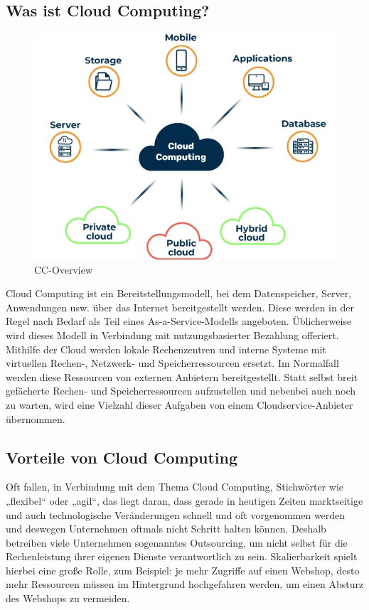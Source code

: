 \subsection{Was ist Cloud Computing?}

\begin{figure}[h]
    \centering
    \includegraphics[scale=0.9]{sections/cloud-computing/images/cc.png}
    \caption{CC-Overview}
    \label{fig:kimldl-comparison}
\end{figure}

Cloud Computing ist ein Bereitstellungsmodell, bei dem Datenspeicher, Server, Anwendungen usw. über das Internet bereitgestellt werden. Diese werden in der Regel nach Bedarf als Teil eines As-a-Service-Modells angeboten. Üblicherweise wird dieses Modell in Verbindung mit nutzungsbasierter Bezahlung offeriert. Mithilfe der Cloud werden lokale Rechenzentren und interne Systeme mit virtuellen Rechen-, Netzwerk- und Speicherressourcen ersetzt. Im Normalfall werden diese Ressourcen von externen Anbietern bereitgestellt. Statt selbst breit gefächerte Rechen- und Speicherressourcen aufzustellen und nebenbei auch noch zu warten, wird eine Vielzahl dieser Aufgaben von einem Cloudservice-Anbieter übernommen.

\subsection{Vorteile von Cloud Computing}

Oft fallen, in Verbindung mit dem Thema Cloud Computing, Stichwörter wie „flexibel“ oder „agil“, das liegt daran, dass gerade in heutigen Zeiten marktseitige und auch technologische Veränderungen schnell und oft vorgenommen werden und deswegen Unternehmen oftmals nicht Schritt halten können. Deshalb betreiben viele Unternehmen sogenanntes Outsourcing, um nicht selbst für die Rechenleistung ihrer eigenen Dienste verantwortlich zu sein. Skalierbarkeit spielt hierbei eine große Rolle, zum Beispiel: je mehr Zugriffe auf einen Webshop, desto mehr Ressourcen müssen im Hintergrund hochgefahren werden, um einen Absturz des Webshops zu vermeiden.

